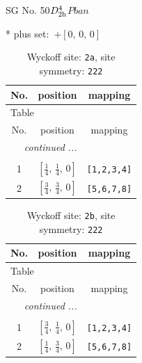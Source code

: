 \documentclass[fleqn,8pt]{jsarticle}
\begin{document}
\setcounter{MaxMatrixCols}{32}

\renewcommand{\tablename}{Table~}
\renewcommand{\figurename}{Figure~}
\begin{center}
\LARGE
SG No. 50\quad$D_{\rm 2h}^{4}$\quad$Pban$\quad[ orthorhombic ]
\end{center}
* plus set:\,\,\,$+\left[ 0,\, 0,\, 0 \right]$
\renewcommand{\arraystretch}{1.2}
\begin{longtable}{ccc}
\caption{Wyckoff site: {\tt 2a}, site symmetry: {\tt 222}}
 \\
 \hline \hline
No. & position & mapping \\ \hline \endfirsthead

\multicolumn{2}{l}{\tablename\ \thetable{}} \\
 \hline \hline
No. & position & mapping \\ \hline \endhead

 \hline \hline
\multicolumn{2}{r}{\footnotesize\it continued ...} \\ \endfoot

 \hline \hline
\multicolumn{2}{r}{} \\ \endlastfoot

1 & $\left[ \frac{1}{4},\, \frac{1}{4},\, 0 \right]$ & {\tt [1,2,3,4]} \\ \hline
2 & $\left[ \frac{3}{4},\, \frac{3}{4},\, 0 \right]$ & {\tt [5,6,7,8]} \\
\end{longtable}
\renewcommand{\arraystretch}{1.2}
\begin{longtable}{ccc}
\caption{Wyckoff site: {\tt 2b}, site symmetry: {\tt 222}}
 \\
 \hline \hline
No. & position & mapping \\ \hline \endfirsthead

\multicolumn{2}{l}{\tablename\ \thetable{}} \\
 \hline \hline
No. & position & mapping \\ \hline \endhead

 \hline \hline
\multicolumn{2}{r}{\footnotesize\it continued ...} \\ \endfoot

 \hline \hline
\multicolumn{2}{r}{} \\ \endlastfoot

1 & $\left[ \frac{3}{4},\, \frac{1}{4},\, 0 \right]$ & {\tt [1,2,3,4]} \\ \hline
2 & $\left[ \frac{1}{4},\, \frac{3}{4},\, 0 \right]$ & {\tt [5,6,7,8]} \\
\end{longtable}
\end{document}
